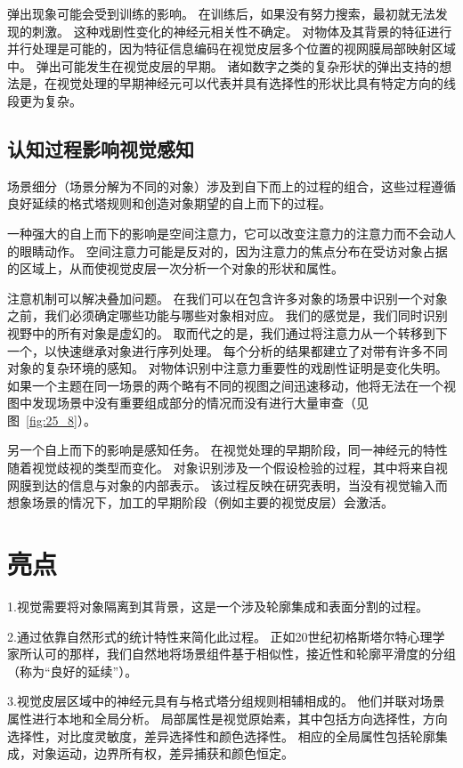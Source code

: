 弹出现象可能会受到训练的影响。
在训练后，如果没有努力搜索，最初就无法发现的刺激。 
这种戏剧性变化的神经元相关性不确定。
对物体及其背景的特征进行并行处理是可能的，因为特征信息编码在视觉皮层多个位置的视网膜局部映射区域中。
弹出可能发生在视觉皮层的早期。
诸如数字之类的复杂形状的弹出支持的想法是，在视觉处理的早期神经元可以代表并具有选择性的形状比具有特定方向的线段更为复杂。



\subsection{认知过程影响视觉感知}

场景细分（场景分解为不同的对象）涉及到自下而上的过程的组合，这些过程遵循良好延续的格式塔规则和创造对象期望的自上而下的过程。


一种强大的自上而下的影响是空间注意力，它可以改变注意力的注意力而不会动人的眼睛动作。
空间注意力可能是反对的，因为注意力的焦点分布在受访对象占据的区域上，从而使视觉皮层一次分析一个对象的形状和属性。


注意机制可以解决叠加问题。
在我们可以在包含许多对象的场景中识别一个对象之前，我们必须确定哪些功能与哪些对象相对应。
我们的感觉是，我们同时识别视野中的所有对象是虚幻的。
取而代之的是，我们通过将注意力从一个转移到下一个，以快速继承对象进行序列处理。
每个分析的结果都建立了对带有许多不同对象的复杂环境的感知。
对物体识别中注意力重要性的戏剧性证明是变化失明。
如果一个主题在同一场景的两个略有不同的视图之间迅速移动，他将无法在一个视图中发现场景中没有重要组成部分的情况而没有进行大量审查（见图~\ref{fig:25_8}）。


另一个自上而下的影响是感知任务。
在视觉处理的早期阶段，同一神经元的特性随着视觉歧视的类型而变化。
对象识别涉及一个假设检验的过程，其中将来自视网膜到达的信息与对象的内部表示。
该过程反映在研究表明，当没有视觉输入而想象场景的情况下，加工的早期阶段（例如主要的视觉皮层）会激活。



\section{亮点}

1.视觉需要将对象隔离到其背景，这是一个涉及轮廓集成和表面分割的过程。 


2.通过依靠自然形式的统计特性来简化此过程。
正如20世纪初格斯塔尔特心理学家所认可的那样，我们自然地将场景组件基于相似性，接近性和轮廓平滑度的分组（称为“良好的延续”）。


3.视觉皮层区域中的神经元具有与格式塔分组规则相辅相成的。
他们并联对场景属性进行本地和全局分析。
局部属性是视觉原始素，其中包括方向选择性，方向选择性，对比度灵敏度，差异选择性和颜色选择性。
相应的全局属性包括轮廓集成，对象运动，边界所有权，差异捕获和颜色恒定。


